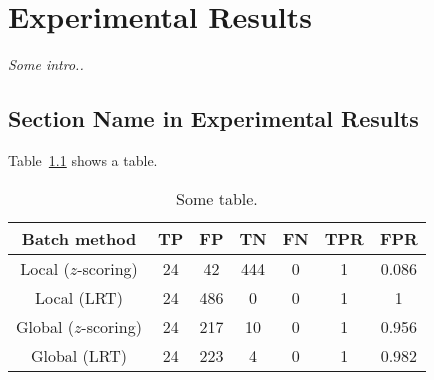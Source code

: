 \setlength{\footskip}{8mm}

\chapter{Experimental Results}
\label{ch:results}

\textit{Some intro..}

\section{Section Name in Experimental Results}
\label{section-name-in-experimental-results}

Table~\ref{tab:hmm-based-detection-results} shows a table.

\begin{table}[t]
  \caption[Text shown in the LOT.]{\small Some table.}
  \begin{center}
    \begin{tabular}{c|c|c|c|c|c|c}
      \hline Batch method & TP & FP & TN & FN & TPR & FPR \\ \hline \hline
      Local ($z$-scoring) & 24 & 42 & 444 & 0 & 1 & 0.086 \\ \hline
      Local (LRT) & 24 & 486 & 0 & 0 & 1 & 1 \\ \hline 
      Global ($z$-scoring) & 24 & 217 & 10 & 0 & 1 & 0.956 \\ \hline 
      Global (LRT) & 24 & 223 & 4 & 0 & 1 & 0.982 \\ \hline
    \end{tabular}
  \end{center}
  \label{tab:hmm-based-detection-results}
\end{table} 

\FloatBarrier


